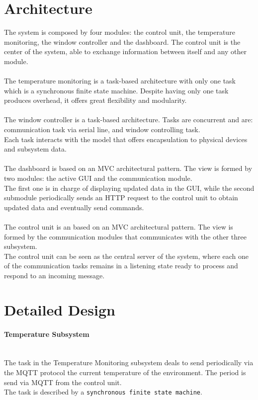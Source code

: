 \documentclass[a4paper,12pt]{report}
\begin{document}
    \section{Architecture}

        The system is composed by four modules: the control unit, the temperature monitoring, the window controller and the dashboard. 
        The control unit is the center of the system, able to exchange information between itself and any other module.\\\\
        The temperature monitoring is a task-based architecture with only one task which is a synchronous finite state machine. 
        Despite having only one task produces overhead, it offers great flexibility and modularity.\\\\
        The window controller is a task-based architecture. Tasks are concurrent and are: communication task via serial line, and window 
        controlling task.\\
        Each task interacts with the model that offers encapsulation to physical devices and subsystem data.\\\\
        The dashboard is based on an MVC architectural pattern. The view is formed by two modules: the active GUI and the communication 
        module. \\
        The first one is in charge of displaying updated data in the GUI, while the second submodule periodically sends an HTTP request 
        to the control unit to obtain updated data and eventually send commands.\\\\
        The control unit is an based on an MVC architectural pattern. The view is formed by the communication modules that communicates 
        with the other three subsystem.\\
        The control unit can be seen as the central server of the system, where each one of the communication tasks remains in a 
        listening state ready to process and respond to an incoming message.

    \section{Detailed Design}

        \paragraph{Temperature Subsystem\\}
            \ \\
            The task in the Temperature Monitoring subsystem deals to send periodically via the MQTT protocol the current temperature of 
            the environment. The period is send via MQTT from the control unit.\\
            The task is described by a \texttt{synchronous finite state machine}. 
\end{document}
